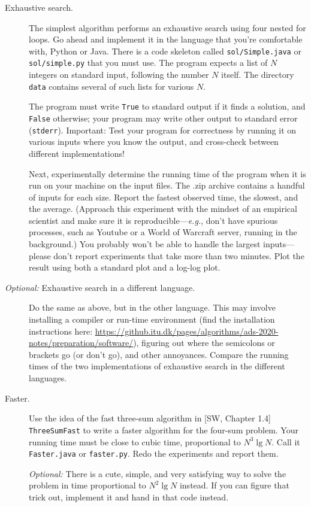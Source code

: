 \documentclass{tufte-handout}
\begin{document}
\begin{description}
  \item[Exhaustive search.]
The simplest algorithm performs an exhaustive search using four nested for loops.
Go ahead and implement it in the language that you're comfortable with, Python or Java.
There is a code skeleton called \texttt{sol/Simple.java} or \texttt{sol/simple.py} that you must use.
The program expects a list of $N$ integers on standard input, following the number $N$ itself.
The directory \texttt{data} contains several of such lists for various $N$.

The program must write \texttt{True} to standard output if it finds a solution, and \texttt{False} otherwise;
your program may write other output to standard error (\texttt{stderr}).
Important: Test your program for correctness by running it on various inputs where you know the output, and cross-check between different implementations!

Next, experimentally determine the running time of the program when it is run on your machine on the input files.
The .zip archive contains a handful of inputs for each size.
Report the fastest observed time, the slowest, and the average.
(Approach this experiment with the mindset of an empirical scientist and make sure it is reproducible---\emph{e.g.}, don't have spurious processes, such as Youtube or a World of Warcraft server, running in the background.)
You probably won't be able to handle the largest inputs---please don't report experiments that take more than two minutes.
Plot the result using both a standard plot and a log-log plot.

\item[\emph{Optional:} Exhaustive search in a different language.]
  Do the same as above, but in the other language.
  This may involve installing a compiler or run-time environment (find the installation instructions here: \url{https://github.itu.dk/pages/algorithms/ads-2020-notes/preparation/software/}), figuring out where the semicolons or brackets go (or don't go), and other annoyances.
  Compare the running times of the two implementations of exhaustive search in the different languages.

\item[Faster.]
  Use the idea of the fast three-sum algorithm in [SW, Chapter 1.4] \texttt{
  ThreeSumFast} to write a faster algorithm for the four-sum problem.
  Your running time must be close to cubic time, proportional to $N^3\operatorname{lg} N$.
  Call it \texttt{Faster.java}  or \texttt{faster.py}.
  Redo the experiments and report them.

  \emph{Optional:} There is a cute, simple, and very satisfying way to solve the problem in time proportional to $N^2\operatorname{lg} N$ instead.
If you can figure that trick out, implement it and hand in that code instead.
\end{description}
\end{document}
